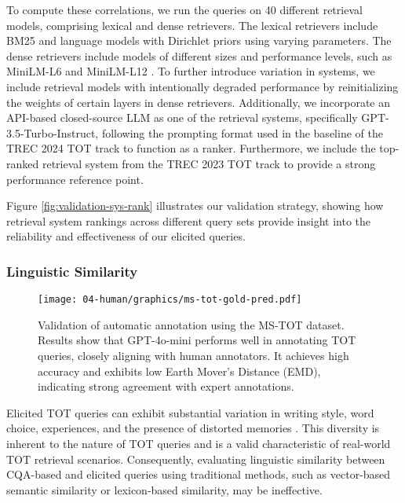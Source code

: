 To compute these correlations, we run the queries on 40 different retrieval models, comprising lexical and dense retrievers. The lexical retrievers include BM25 \cite{Robertson1995OkapiBM25} and language models with Dirichlet priors \cite{zhai2001DirichletSmoothing} using varying parameters. The dense retrievers include models of different sizes and performance levels, such as MiniLM-L6 and MiniLM-L12 \cite{miniLM}. To further introduce variation in systems, we include retrieval models with intentionally degraded performance by reinitializing the weights of certain layers in dense retrievers. Additionally, we incorporate an API-based closed-source LLM as one of the retrieval systems, specifically GPT-3.5-Turbo-Instruct, following the prompting format used in the baseline of the TREC 2024 TOT track to function as a ranker.
Furthermore, we include the top-ranked retrieval system from the TREC 2023 TOT track \cite{luis24totDPR, arguello2023overview} to provide a strong performance reference point.

Figure \ref{fig:validation-sys-rank} illustrates our validation strategy, showing how retrieval system rankings across different query sets provide insight into the reliability and effectiveness of our elicited queries.



\subsubsection{\textbf{Linguistic Similarity}}\label{subsubsec:ling-sim}
\begin{figure} 
\centering
\texttt{[image: 04-human/graphics/ms-tot-gold-pred.pdf]}
\caption{
Validation of automatic annotation using the MS-TOT dataset.
Results show that GPT-4o-mini performs well in annotating TOT queries, closely aligning with human annotators. It achieves high accuracy and exhibits low Earth Mover’s Distance (EMD), indicating strong agreement with expert annotations.}
\label{fig:automatic-annotation-validation}
\end{figure}

Elicited TOT queries can exhibit substantial variation in writing style, word choice, experiences, and the presence of distorted memories \cite{Meier21-complex-reddit, arguello-movie-identification}. This diversity is inherent to the nature of TOT queries and is a valid characteristic of real-world TOT retrieval scenarios. Consequently, evaluating linguistic similarity between CQA-based and elicited queries using traditional methods, such as vector-based semantic similarity or lexicon-based similarity, may be ineffective.



